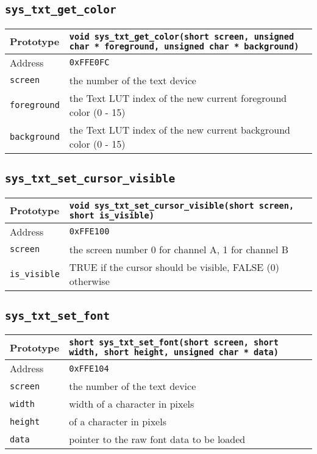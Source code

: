 \subsection*{\texttt{sys\_txt\_get\_color}}
\begin{tabular}{|l||l|} \hline
Prototype & \lstinline!void sys_txt_get_color(short screen, unsigned char * foreground, unsigned char * background)! \\ \hline
Address & \texttt{0xFFE0FC} \\ \hline
\lstinline!screen! & the number of the text device \\ \hline
\lstinline!foreground! & the Text LUT index of the new current foreground color (0 - 15) \\ \hline
\lstinline!background! & the Text LUT index of the new current background color (0 - 15) \\ \hline
\end{tabular}

\subsection*{\texttt{sys\_txt\_set\_cursor\_visible}}
\begin{tabular}{|l||l|} \hline
Prototype & \lstinline!void sys_txt_set_cursor_visible(short screen, short is_visible)! \\ \hline
Address & \texttt{0xFFE100} \\ \hline
\lstinline!screen! & the screen number 0 for channel A, 1 for channel B \\ \hline
\lstinline!is_visible! & TRUE if the cursor should be visible, FALSE (0) otherwise \\ \hline
\end{tabular}

\subsection*{\texttt{sys\_txt\_set\_font}}
\begin{tabular}{|l||l|} \hline
Prototype & \lstinline!short sys_txt_set_font(short screen, short width, short height, unsigned char * data)! \\ \hline
Address & \texttt{0xFFE104} \\ \hline
\lstinline!screen! & the number of the text device \\ \hline
\lstinline!width! & width of a character in pixels \\ \hline
\lstinline!height! & of a character in pixels \\ \hline
\lstinline!data! & pointer to the raw font data to be loaded \\ \hline
\end{tabular}

